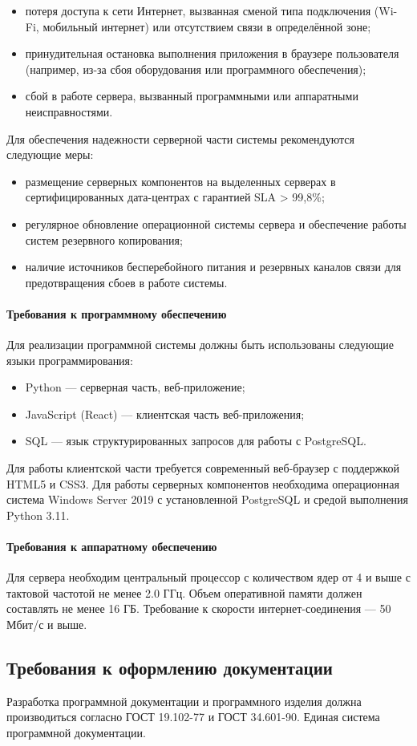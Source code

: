 \begin{itemize}
	\item потеря доступа к сети Интернет, вызванная сменой типа подключения (Wi-Fi, мобильный интернет) или отсутствием связи в определённой зоне;
	\item принудительная остановка выполнения приложения в браузере пользователя (например, из-за сбоя оборудования или программного обеспечения);
	\item сбой в работе сервера, вызванный программными или аппаратными неисправностями.
\end{itemize}

Для обеспечения надежности серверной части системы рекомендуются следующие меры:
\begin{itemize}
	\item размещение серверных компонентов на выделенных серверах в сертифицированных дата-центрах с гарантией SLA > 99,8\%;
	\item регулярное обновление операционной системы сервера и обеспечение работы систем резервного копирования;
	\item наличие источников бесперебойного питания и резервных каналов связи для предотвращения сбоев в работе системы.
\end{itemize}


\paragraph{Требования к программному обеспечению}

Для реализации программной системы должны быть использованы следующие языки программирования:

\begin{itemize}
	\item Python — серверная часть, веб-приложение;
	\item JavaScript (React) — клиентская часть веб-приложения;
	\item SQL — язык структурированных запросов для работы с PostgreSQL.
\end{itemize}

Для работы клиентской части требуется современный веб-браузер с поддержкой HTML5 и CSS3.
Для работы серверных компонентов необходима операционная система Windows Server 2019 с установленной PostgreSQL и средой выполнения Python 3.11.

\paragraph{Требования к аппаратному обеспечению}

Для сервера необходим центральный процессор с количеством ядер от 4 и выше с тактовой частотой не менее 2.0 ГГц. Объем оперативной памяти должен составлять не менее 16 ГБ.
Требование к скорости интернет-соединения — 50 Мбит/с и выше.

\subsection{Требования к оформлению документации}

Разработка программной документации и программного изделия должна производиться согласно ГОСТ 19.102-77 и ГОСТ 34.601-90. Единая система программной документации.
